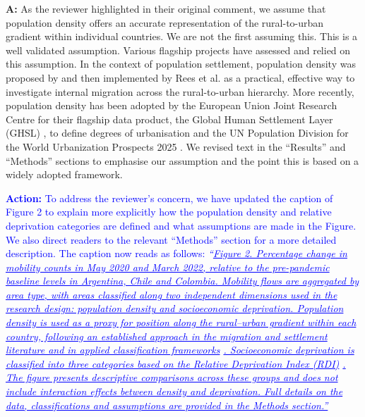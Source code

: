 \documentclass[12pt,a4paper,oneside, reqno]{amsart}
\begin{document}
\setlength{\leftskip}{1cm}\textbf{A:} As the reviewer highlighted in their original comment, we assume that population density offers an accurate representation of the rural-to-urban gradient within individual countries.  We are not the first assuming this. This is a well validated assumption. Various flagship projects have assessed and relied on this assumption. In the context of population settlement, population density was proposed by \parencite{championhugo2004} and then implemented by Rees et al. \parencite{rees1999internal, rees2017impact} as a practical, effective way to investigate internal migration across the rural-to-urban hierarchy. More recently, population density has been adopted by the European Union Joint Research Centre for their flagship data product, the Global Human Settlement Layer (GHSL) \parencite{GHSL19}, to define degrees of urbanisation and the UN Population Division for the World Urbanization Prospects 2025 \parencite{UNpopulation25}. We revised text in the ``Results'' and ``Methods'' sections to emphasise our assumption and the point this is based on a widely adopted framework.

\setlength{\leftskip}{1cm}\textcolor{blue}{\textbf{Action:} To address the reviewer’s concern, we have updated the caption of Figure 2 to explain more explicitly how the population density and relative deprivation categories are defined and what assumptions are made in the Figure. We also direct readers to the relevant ``Methods'' section for a more detailed description. The caption now reads as follows: \textit{``\uline{Figure 2. Percentage change in mobility counts in May 2020 and March 2022, relative to the pre-pandemic baseline levels in Argentina, Chile and Colombia. Mobility flows are aggregated by area type, with areas classified along two independent dimensions used in the research design: population density and socioeconomic deprivation. Population density is used as a proxy for position along the rural–urban gradient within each country, following an established approach in the migration and settlement literature and in applied classification frameworks} \parencite{championhugo2004, rees1999internal, rees2017impact, GHSL19, UNpopulation25}\uline{. Socioeconomic deprivation is classified into three categories based on the Relative Deprivation Index (RDI)} \parencite{RDI2022}\uline{. The figure presents descriptive comparisons across these groups and does not include interaction effects between density and deprivation. Full details on the data, classifications and assumptions are provided in the Methods section.''}}}
\end{document}
